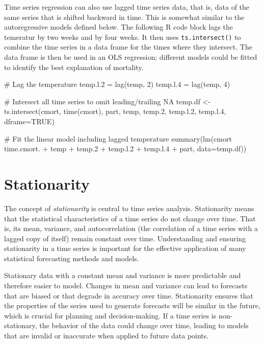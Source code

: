 Time series regression can also use lagged time series data, that is, data of the same series that is shifted backward in time. This is somewhat similar to the autoregressive models defined below. The following R code block lags the temeratur by two weeks and by four weeks. It then uses \texttt{ts.intersect()} to combine the time series in a data frame for the times where they intersect. The data frame is then be used in an OLS regression; different models could be fitted to identify the best explanation of mortality.

\begin{Rcode}
# Lag the temperature
temp.l.2 = lag(temp, 2)
temp.l.4 = lag(temp, 4)

# Intersect all time series to omit leading/trailing NA
temp.df <- ts.intersect(cmort, time(cmort), part, 
                        temp, temp.2, temp.l.2, temp.l.4, 
                        dframe=TRUE)
                        
# Fit the linear model including lagged temperature
summary(lm(cmort ~ time.cmort. + temp + temp.2 + 
                   temp.l.2 + temp.l.4 + part, data=temp.df))
\end{Rcode}

\section{Stationarity}

The concept of \emph{stationarity} is central to time series analysis. Stationarity means that the statistical characteristics of a time series do not change over time. That is, its mean, variance, and autocorrelation (the correlation of a time series with a lagged copy of itself) remain constant over time. Understanding and ensuring stationarity in a time series is important for the effective application of many statistical forecasting methods and models.

Stationary data with a constant mean and variance is more predictable and therefore easier to model. Changes in mean and variance can lead to forecasts that are biased or that degrade in accuracy over time. Stationarity ensures that the properties of the series used to generate forecasts will be similar in the future, which is crucial for planning and decision-making. If a time series is non-stationary, the behavior of the data could change over time, leading to models that are invalid or inaccurate when applied to future data points.

